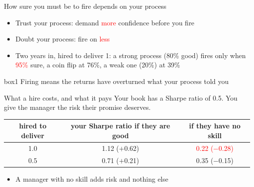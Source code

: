 \documentclass[aspectratio=169,10pt]{beamer}
\begin{document}
\begin{frame}[label=fire]{How sure you must be to fire depends on your process}
\begin{itemize}
\item Trust your process: demand \textcolor{red}{more} confidence before you fire
\vskip 12pt
\item Doubt your process: fire on \textcolor{red}{less}
\vskip 12pt
\item Two years in, hired to deliver 1: a strong process (80\% good) fires only when \textcolor{red}{95\%} sure, a coin flip at 76\%, a weak one (20\%) at 39\%
\end{itemize}
\vskip 14pt
\begin{beamercolorbox}[rounded=true,sep=8pt,center]{box1}
Firing means the returns have overturned what your process told you
\end{beamercolorbox}
\vskip 10pt
\hfill \hyperlink{appendix_fire}{}
\end{frame}

\begin{frame}[label=costs]{What a hire costs, and what it pays}
Your book has a Sharpe ratio of 0.5. You give the manager the risk their promise deserves.
\vskip 4pt
\begin{center}
\renewcommand{\arraystretch}{1.5}
\begin{tabular}{ccc}
\toprule
hired to deliver & your Sharpe ratio if they are good & if they have no skill \\
\midrule
1.0 & 1.12 \;($+$0.62) & \textcolor{red}{0.22 \;($-$0.28)} \\
0.5 & 0.71 \;($+$0.21) & 0.35 \;($-$0.15) \\
\bottomrule
\end{tabular}
\end{center}
\vskip 8pt
\begin{itemize}
\item A manager with no skill adds risk and nothing else
\hfill \hyperlink{appendix_sharpe}{}
\end{itemize}
\end{frame}
\end{document}
